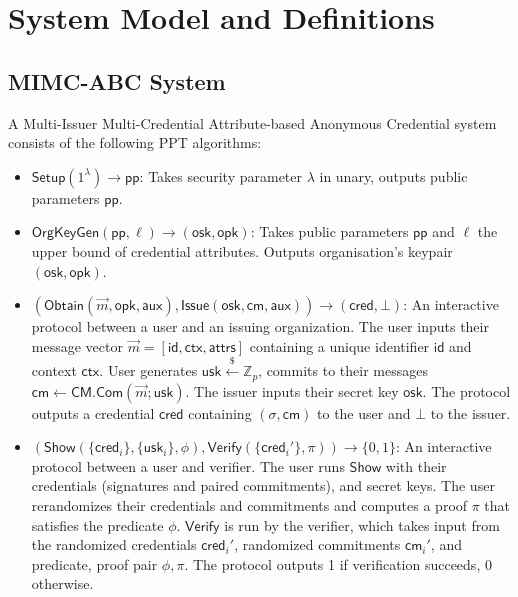 \section{System Model and Definitions}
\subsection{MIMC-ABC System}
A Multi-Issuer Multi-Credential Attribute-based Anonymous Credential system consists of the following PPT algorithms:

\begin{definition}
\begin{itemize}
    \item $\mathsf{Setup}(1^\lambda) \to \mathsf{pp}$: Takes security parameter $\lambda$ in unary, outputs public parameters $\mathsf{pp}$.
    
    \item $\mathsf{OrgKeyGen}(\mathsf{pp}, \ell) \to (\mathsf{osk}, \mathsf{opk})$: Takes public parameters $\mathsf{pp}$ and $\ell$ the upper bound of credential attributes. Outputs organisation's keypair $(\mathsf{osk}, \mathsf{opk})$.
       
    \item $(\mathsf{Obtain}(\vec{m}, \mathsf{opk}, \mathsf{aux}), \mathsf{Issue}(\mathsf{osk}, \mathsf{cm}, \mathsf{aux})) \rightarrow (\mathsf{cred}, \bot)$: An interactive protocol between a user and an issuing organization. The user inputs their message vector $\vec{m} = [\mathsf{id}, \mathsf{ctx}, \mathsf{attrs}]$ containing a unique identifier $\mathsf{id}$ and context $\mathsf{ctx}$. User generates $\mathsf{usk} \stackrel{\$}{\leftarrow} \mathbb{Z}_p$, commits to their messages $\mathsf{cm} \gets \mathsf{CM.Com}(\vec{m}; \mathsf{usk})$. The issuer inputs their secret key $\mathsf{osk}$. The protocol outputs a credential $\mathsf{cred}$ containing $(\sigma, \mathsf{cm})$ to the user and $\bot$ to the issuer.    
    
    \item $(\mathsf{Show}(\{\mathsf{cred}_i\}, \{\mathsf{usk}_i\}, \phi), \mathsf{Verify}(\{\mathsf{cred}_i'\}, \pi)) \rightarrow \{0,1\}$: An interactive protocol between a user and verifier. The user runs $\mathsf{Show}$ with their credentials (signatures and paired commitments), and secret keys. The user rerandomizes their credentials and commitments and computes a proof $\pi$ that satisfies the predicate $\phi$.
    $\mathsf{Verify}$ is run by the verifier, which takes input from the randomized credentials $\mathsf{cred}_i'$, randomized commitments $\mathsf{cm}_i'$, and predicate, proof pair $\phi, \pi$. The protocol outputs 1 if verification succeeds, 0 otherwise.
\end{itemize}
\end{definition}

